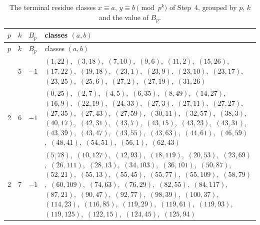 \documentclass[11pt]{article}
\begin{document}
\begingroup\small
\setlength{\LTcapwidth}{\textwidth}
\begin{longtable}{@{}rrl>{\raggedright\arraybackslash}p{}@{}}
\caption{The terminal residue classes $x\equiv a$, $y\equiv b\pmod{p^k}$ of Step~4, grouped by $p$, $k$ and the value of $B_p$.}\label{tab:local}\\
\hline $p$ & $k$ & $B_p$ & classes $(a,b)$\\\hline\endfirsthead
\hline $p$ & $k$ & $B_p$ & classes $(a,b)$\\\hline\endhead\hline\endfoot
2 & 5 & $-1$ & $(1,22)$,\allowbreak\ $(3,18)$,\allowbreak\ $(7,10)$,\allowbreak\ $(9,6)$,\allowbreak\ $(11,2)$,\allowbreak\ $(15,26)$,\allowbreak\ $(17,22)$,\allowbreak\ $(19,18)$,\allowbreak\ $(23,1)$,\allowbreak\ $(23,9)$,\allowbreak\ $(23,10)$,\allowbreak\ $(23,17)$,\allowbreak\ $(23,25)$,\allowbreak\ $(25,6)$,\allowbreak\ $(27,2)$,\allowbreak\ $(27,19)$,\allowbreak\ $(31,26)$\\
2 & 6 & $-1$ & $(0,25)$,\allowbreak\ $(2,7)$,\allowbreak\ $(4,5)$,\allowbreak\ $(6,35)$,\allowbreak\ $(8,49)$,\allowbreak\ $(14,27)$,\allowbreak\ $(16,9)$,\allowbreak\ $(22,19)$,\allowbreak\ $(24,33)$,\allowbreak\ $(27,3)$,\allowbreak\ $(27,11)$,\allowbreak\ $(27,27)$,\allowbreak\ $(27,35)$,\allowbreak\ $(27,43)$,\allowbreak\ $(27,59)$,\allowbreak\ $(30,11)$,\allowbreak\ $(32,57)$,\allowbreak\ $(38,3)$,\allowbreak\ $(40,17)$,\allowbreak\ $(42,31)$,\allowbreak\ $(43,7)$,\allowbreak\ $(43,15)$,\allowbreak\ $(43,23)$,\allowbreak\ $(43,31)$,\allowbreak\ $(43,39)$,\allowbreak\ $(43,47)$,\allowbreak\ $(43,55)$,\allowbreak\ $(43,63)$,\allowbreak\ $(44,61)$,\allowbreak\ $(46,59)$,\allowbreak\ $(48,41)$,\allowbreak\ $(54,51)$,\allowbreak\ $(56,1)$,\allowbreak\ $(62,43)$\\
2 & 7 & $-1$ & $(5,78)$,\allowbreak\ $(10,127)$,\allowbreak\ $(12,93)$,\allowbreak\ $(18,119)$,\allowbreak\ $(20,53)$,\allowbreak\ $(23,69)$,\allowbreak\ $(26,111)$,\allowbreak\ $(28,13)$,\allowbreak\ $(34,103)$,\allowbreak\ $(36,101)$,\allowbreak\ $(50,87)$,\allowbreak\ $(52,21)$,\allowbreak\ $(55,13)$,\allowbreak\ $(55,45)$,\allowbreak\ $(55,77)$,\allowbreak\ $(55,109)$,\allowbreak\ $(58,79)$,\allowbreak\ $(60,109)$,\allowbreak\ $(74,63)$,\allowbreak\ $(76,29)$,\allowbreak\ $(82,55)$,\allowbreak\ $(84,117)$,\allowbreak\ $(87,21)$,\allowbreak\ $(90,47)$,\allowbreak\ $(92,77)$,\allowbreak\ $(98,39)$,\allowbreak\ $(100,37)$,\allowbreak\ $(114,23)$,\allowbreak\ $(116,85)$,\allowbreak\ $(119,29)$,\allowbreak\ $(119,61)$,\allowbreak\ $(119,93)$,\allowbreak\ $(119,125)$,\allowbreak\ $(122,15)$,\allowbreak\ $(124,45)$,\allowbreak\ $(125,94)$\\

\end{longtable}
\end{document}
